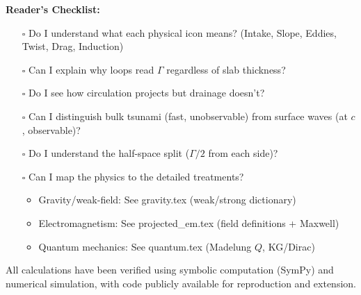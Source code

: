\textbf{Reader's Checklist:}
\begin{itemize}
\item[$\square$] Do I understand what each physical icon means? (Intake, Slope, Eddies, Twist, Drag, Induction)
\item[$\square$] Can I explain why loops read $\Gamma$ regardless of slab thickness?
\item[$\square$] Do I see how circulation projects but drainage doesn't?
\item[$\square$] Can I distinguish bulk tsunami (fast, unobservable) from surface waves (at $c$, observable)?
\item[$\square$] Do I understand the half-space split ($\Gamma/2$ from each side)?
\item[$\square$] Can I map the physics to the detailed treatments?
  \begin{itemize}
    \item Gravity/weak-field: See gravity.tex (weak/strong dictionary)
    \item Electromagnetism: See projected\_em.tex (field definitions + Maxwell)
    \item Quantum mechanics: See quantum.tex (Madelung $Q$, KG/Dirac)
  \end{itemize}
\end{itemize}

All calculations have been verified using symbolic computation (SymPy) and numerical simulation, with code publicly available for reproduction and extension.
